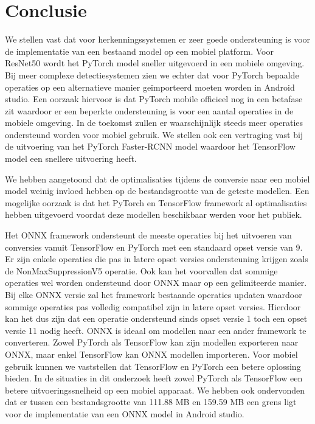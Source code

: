 \section{Conclusie}
We stellen vast dat voor herkenningssystemen er zeer goede ondersteuning is voor de implementatie van een bestaand model op een mobiel platform.
Voor ResNet50 wordt het PyTorch model sneller uitgevoerd in een mobiele omgeving.
Bij meer complexe detectiesystemen zien we echter dat voor PyTorch bepaalde operaties op een alternatieve manier ge\"importeerd moeten worden in Android studio.
Een oorzaak hiervoor is dat PyTorch mobile officieel nog in een betafase zit waardoor er een beperkte ondersteuning is voor een aantal operaties in de mobiele omgeving.
In de toekomst zullen er waarschijnlijk steeds meer operaties ondersteund worden voor mobiel gebruik.
We stellen ook een vertraging vast bij de uitvoering van het PyTorch Faster-RCNN model waardoor het TensorFlow model een snellere uitvoering heeft.

We hebben aangetoond dat de optimalisaties tijdens de conversie naar een mobiel model weinig invloed hebben op de bestandsgrootte van de geteste modellen.
Een mogelijke oorzaak is dat het PyTorch en TensorFlow framework al optimalisaties hebben uitgevoerd voordat deze modellen beschikbaar werden voor het publiek.

Het ONNX framework ondersteunt de meeste operaties bij het uitvoeren van conversies vanuit TensorFlow en PyTorch met een standaard opset versie van 9.
Er zijn enkele operaties die pas in latere opset versies ondersteuning krijgen zoals de NonMaxSuppressionV5 operatie.
Ook kan het voorvallen dat sommige operaties wel worden ondersteund door ONNX maar op een gelimiteerde manier.
Bij elke ONNX versie zal het framework bestaande operaties updaten waardoor sommige operaties pas volledig compatibel zijn in latere opset versies.
Hierdoor kan het dus zijn dat een operatie ondersteund sinds opset versie 1 toch een opset versie 11 nodig heeft.
ONNX is ideaal om modellen naar een ander framework te converteren.
Zowel PyTorch als TensorFlow kan zijn modellen exporteren naar ONNX, maar enkel TensorFlow kan ONNX modellen importeren.
Voor mobiel gebruik kunnen we vaststellen dat TensorFlow en PyTorch een betere oplossing bieden.
In de situaties in dit onderzoek heeft zowel PyTorch als TensorFlow een betere uitvoeringssnelheid op een mobiel apparaat.
We hebben ook ondervonden dat er tussen een bestandsgrootte van 111.88 MB en 159.59 MB een grens ligt voor de implementatie van een ONNX model in Android studio.

